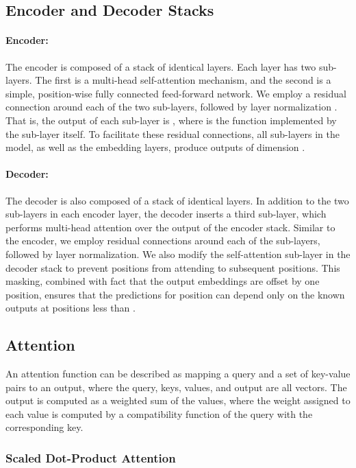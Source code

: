 \documentclass{article}
\begin{document}
\subsection{Encoder and Decoder Stacks}

\paragraph{Encoder:}The encoder is composed of a stack of  identical layers. Each layer has two sub-layers. The first is a multi-head self-attention mechanism, and the second is a simple, position-wise fully connected feed-forward network.   We employ a residual connection \citep{he2016deep} around each of the two sub-layers, followed by layer normalization \cite{layernorm2016}.  That is, the output of each sub-layer is , where  is the function implemented by the sub-layer itself.  To facilitate these residual connections, all sub-layers in the model, as well as the embedding layers, produce outputs of dimension .

\paragraph{Decoder:}The decoder is also composed of a stack of  identical layers.  In addition to the two sub-layers in each encoder layer, the decoder inserts a third sub-layer, which performs multi-head attention over the output of the encoder stack.  Similar to the encoder, we employ residual connections around each of the sub-layers, followed by layer normalization.  We also modify the self-attention sub-layer in the decoder stack to prevent positions from attending to subsequent positions.  This masking, combined with fact that the output embeddings are offset by one position, ensures that the predictions for position  can depend only on the known outputs at positions less than .



\subsection{Attention} \label{sec:attention}
An attention function can be described as mapping a query and a set of key-value pairs to an output, where the query, keys, values, and output are all vectors.  The output is computed as a weighted sum of the values, where the weight assigned to each value is computed by a compatibility function of the query with the corresponding key.

\subsubsection{Scaled Dot-Product Attention} \label{sec:scaled-dot-prod}
\end{document}
